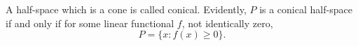 A half-space which is a cone is called conical. Evidently, $P$ is a conical half-space if and only if for some linear functional $f$, not identically zero,
$$
P = \{x : f(x) \geq 0\}.
$$
